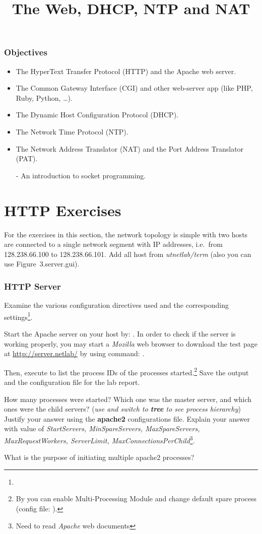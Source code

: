 \documentclass{../UTNetLab}
\title{The Web, DHCP, NTP and NAT}
\begin{document}
\section*{Objectives}
\begin{itemize}
    \item The HyperText Transfer Protocol (HTTP) and the Apache web server.
    \item The Common Gateway Interface (CGI) and other web-server app (like PHP, Ruby, Python, \dots).
    \item The Dynamic Host Configuration Protocol (DHCP).
    \item The Network Time Protocol (NTP).
    \item The Network Address Translator (NAT) and the Port Address Translator (PAT).
    \item [-] An introduction to socket programming.
\end{itemize}

\part{HTTP Exercises}
For the exercises in this section, the network topology is simple with two hosts are connected to a single network segment with IP addresses, i.e.\  from 128.238.66.100 to 128.238.66.101.
Add all host from \textit{utnetlab/term} (also you can use {Figure~3.server.gui}).

\section{HTTP Server}
Examine the various configuration directives used and the corresponding settings\footnote{}.

Start the Apache server on your host by: .
In order to check if the server is working properly, you may start a \textit{Mozilla} web browser to download the test page at \url{http://server.netlab/} by using command: .

Then, execute  to list the process IDs of the  processes started.\footnote{By  you can enable Multi-Processing Module and change default spare process (config file: ).}
Save the output and the configuration file for the lab report.

\begin{report}
    \item How many  processes were started?
    Which one was the master server, and which ones were the child servers? (\textit{use  and switch to \textbf{tree} to see process hierarchy})
    Justify your answer using the \textbf{apache2} configurations file.
    Explain your answer with value of \textit{StartServers, MinSpareServers, MaxSpareServers, MaxRequestWorkers, ServerLimit, MaxConnectionsPerChild}\footnote{Need to read \textit{Apache} web documents}.

    \item What is the purpose of initiating multiple apache2 processes?
\end{report}
\end{document}
